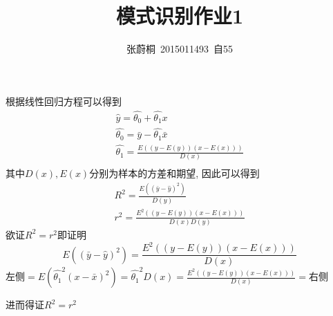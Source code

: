 \documentclass[UTF8,a4paper]{ctexart}
\title{模式识别作业1}
\author{张蔚桐\ 2015011493\ 自55}
\begin{document}
\maketitle
\section{}
根据线性回归方程可以得到$$\begin{aligned}
\hat{y}=\hat{\theta_0}+\hat{\theta_1}x \\ 
\hat{\theta_0}=\bar{y}-\hat{\theta_1}\bar{x} \\
\hat{\theta_1}=\frac{E((y-E(y))(x-E(x)))}{D(x)}\\
\end{aligned}$$其中$D(x),E(x)$分别为样本的方差和期望,
因此可以得到$$\begin{aligned}
R^2=\frac{E((\bar{y}-\hat{y})^2)}{D(y)} \\
r^2=\frac{E^2((y-E(y))(x-E(x)))}{D(x)D(y)} \end{aligned} $$
欲证$R^2=r^2$即证明$$E((\bar{y}-\hat{y})^2)=\frac{E^2((y-E(y))(x-E(x)))}{D(x)}$$
左侧$=E(\hat{\theta_1}^2(x-\bar{x})^2)=\hat{\theta_1}^2D(x)=\frac{E^2((y-E(y))(x-E(x)))}{D(x)}=$右侧

进而得证$R^2=r^2$
\section{}
\end{document}
